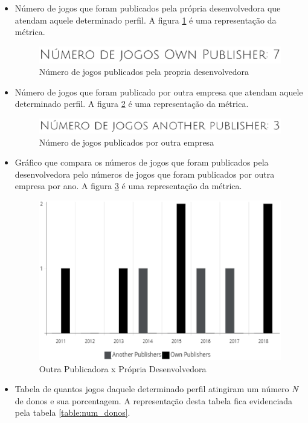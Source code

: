 \begin{itemize}
	\item Número de jogos que foram publicados pela própria desenvolvedora que atendam aquele determinado perfil. A figura \ref{image:own} é uma representação da métrica.
	\begin{figure}
	\centering
	\includegraphics[scale=0.5]{figuras/own_publisher.eps}
	\caption{Número de jogos publicados pela propria desenvolvedora}
	\label{image:own}
	\end{figure}
	\item Número de jogos que foram publicado por outra empresa que atendam aquele determinado perfil. A figura \ref{image:another} é uma representação da métrica.
	\begin{figure}
	\centering
	\includegraphics[scale=0.5]{figuras/another_publisher.eps}
	\caption{Número de jogos publicados por outra empresa}
	\label{image:another}
	\end{figure}
	\item Gráfico que compara os números de jogos que foram publicados pela desenvolvedora pelo números de jogos que foram publicados por outra empresa por ano. A figura \ref{image:anotherxown} é uma representação da métrica.
	\begin{figure}
	\centering
	\includegraphics[scale=0.4]{figuras/anotherxown.eps}
	\caption{Outra Publicadora x Própria Desenvolvedora}
	\label{image:anotherxown}
	\end{figure}
	\item Tabela de quantos jogos daquele determinado perfil atingiram um número \textit{N} de donos e sua porcentagem. A representação desta tabela fica evidenciada pela tabela \ref{table:num_donos}.

\end{itemize}
